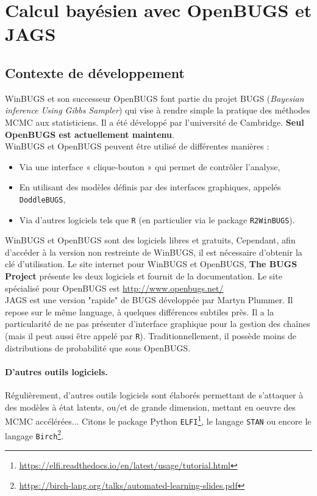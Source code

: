 \section{Calcul bayésien avec OpenBUGS et JAGS}\label{annexe:openbugs-jags}

\subsection{Contexte de développement}

WinBUGS et son successeur OpenBUGS font partie du projet BUGS ({\it Bayesian inference Using Gibbs Sampler}) qui vise à rendre simple la pratique des méthodes MCMC aux statisticiens. Il a été développé par l'université de Cambridge. {\bf Seul OpenBUGS est actuellement maintenu}. \\

WinBUGS et OpenBUGS peuvent être utilisé de différentes manières :
\begin{itemize}
\item Via une interface « clique-bouton » qui permet de contrôler l'analyse,
\item En utilisant des modèles définis par des interfaces graphiques, appelés \texttt{DoddleBUGS},
\item Via d'autres logiciels tels que \texttt{R} (en particulier via le package \texttt{R2WinBUGS}).
\end{itemize}
WinBUGS et OpenBUGS sont des logiciels libres et gratuits, Cependant, afin d'accéder à la version non restreinte de WinBUGS, il est nécessaire d'obtenir la clé d'utilisation. Le site internet pour WinBUGS et OpenBUGS, {\bf The BUGS Project} présente les deux logiciels et fournit de la documentation. Le site spécialisé pour OpenBUGS est \url{http://www.openbugs.net/} \\

JAGS est une version "rapide" de BUGS développée par Martyn Plummer. Il repose sur le même language, à quelques différences subtiles près. Il a la particularité de ne pas présenter d'interface graphique pour la gestion des cha\^ines (mais il peut aussi être appelé par \texttt{R}). Traditionnellement, il possède moins de distributions de probabilité que sous OpenBUGS. 

\paragraph{D'autres outils logiciels.} Régulièrement, d'autres outils logiciels sont élaborés permettant de s'attaquer à des modèles à état latents, ou/et de grande dimension, mettant en oeuvre des MCMC accélérées... Citons le package Python \texttt{ELFI}\footnote{\url{https://elfi.readthedocs.io/en/latest/usage/tutorial.html}}, le langage \texttt{STAN} ou encore le langage \texttt{Birch}\footnote{\url{https://birch-lang.org/talks/automated-learning-slides.pdf}}. 

